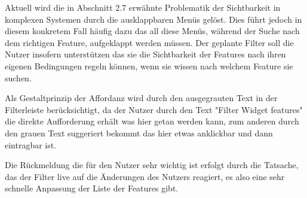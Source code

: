Aktuell wird die in Abschnitt 2.7 erwähnte Problematik der Sichtbarkeit in komplexen Systemen durch die ausklappbaren Menüs gelöst.
Dies führt jedoch in diesem konkretem Fall häufig dazu das all diese Menüs, während der Suche nach dem richtigen Feature, aufgeklappt werden müssen.
Der geplante Filter soll die Nutzer insofern unterstützen das sie die Sichtbarkeit der Features nach ihren eigenen Bedingungen regeln können, wenn sie wissen nach welchem Feature sie suchen.

Als Gestaltprinzip der Affordanz wird durch den ausgegrauten Text in der Filterleiste berücksichtigt, da der Nutzer durch den Text "Filter Widget features" die direkte Aufforderung erhält was hier getan werden kann, zum anderen durch den grauen Text suggeriert bekommt das hier etwas anklickbar und dann eintragbar ist.

Die Rückmeldung die für den Nutzer sehr wichtig ist erfolgt durch die Tatsache, das der Filter live auf die Änderungen des Nutzers reagiert, es also eine sehr schnelle Anpassung der Liste der Features gibt.

